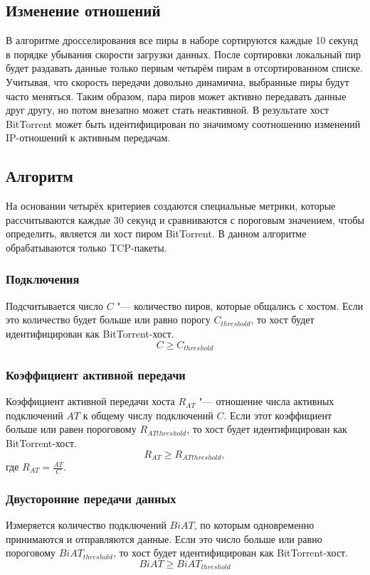 \documentclass[bachelor, och, coursework]{SCWorks}
\begin{document}
\subsection{Изменение отношений}
В алгоритме дросселирования все пиры в наборе сортируются каждые 10 секунд в порядке убывания скорости загрузки данных.
После сортировки локальный пир будет раздавать данные только первым четырём пирам в отсортированном списке.
Учитывая, что скорость передачи довольно динамична, выбранные пиры будут часто меняться. Таким образом, пара пиров
может активно передавать данные друг другу, но потом внезапно может стать неактивной. В результате хост BitTorrent может
быть идентифицирован по значимому соотношению изменений IP-отношений к активным передачам.

\subsection{Алгоритм}
На основании четырёх критериев создаются специальные метрики, которые рассчитываются каждые 30 секунд
и сравниваются с пороговым значением, чтобы определить, является ли хост пиром BitTorrent. В данном алгоритме
обрабатываются только TCP-пакеты. 

\subsubsection{Подключения}
Подсчитывается число $C$ "--- количество пиров, которые общались с хостом. Если это количество будет больше или равно порогу $C_{threshold}$, то хост будет идентифицирован как BitTorrent-хост.
\[ C \geq C_{threshold} \]

\subsubsection{Коэффициент активной передачи}
Коэффициент активной передачи хоста $R_{AT}$ "--- отношение числа активных подключений $AT$ к общему числу подключений $C$.
Если этот коэффициент больше или равен пороговому $R_{ATthreshold}$, то хост будет идентифицирован как BitTorrent-хост.
\[ R_{AT} \geq R_{ATthreshold}, \]
где $R_{AT} = \frac{AT}{C}$.

\subsubsection{Двусторонние передачи данных}
Измеряется количество подключений $BiAT$, по которым одновременно принимаются и отправляются данные. 
Если это число больше или равно пороговому $BiAT_{threshold}$, то хост будет идентифицирован как BitTorrent-хост.
\[ BiAT \geq BiAT_{threshold} \]
\end{document}
